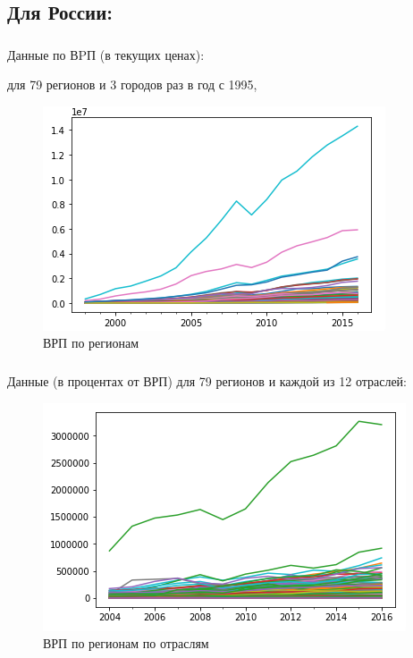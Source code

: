 \documentclass[c, dvipsnames]{beamer}  %
\begin{document}
\subsection{Для России:} 


\begin{frame}[shrink=5]
\frametitle{\insertsection} 
\framesubtitle{\insertsubsection}


Данные по ВPП (в текущих ценах): 

для 79 регионов и 3 городов раз в год с 1995, 


\begin{figure}
	\centering
	\includegraphics[width=0.7\linewidth]{screenshot014}
	\caption{ВРП по регионам}
	\label{fig:screenshot014}
\end{figure}


\end{frame}


\begin{frame}[shrink=5]
\frametitle{\insertsection} 
\framesubtitle{\insertsubsection}

Данные (в процентах от ВРП) для 79 регионов и каждой из 12 отраслей: 

%
%





\begin{figure}
	\centering
	\includegraphics[width=0.7\linewidth]{screenshot015}
	\caption{ВРП по регионам по отраслям}
	\label{fig:screenshot015}
\end{figure}



\end{frame}
\end{document}
